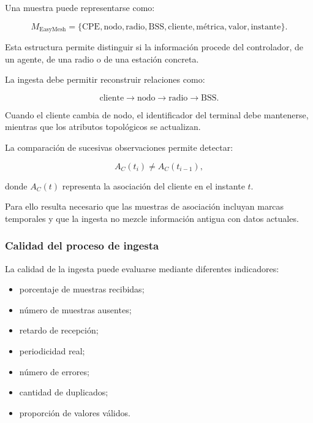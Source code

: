 Una muestra puede representarse como:

\[
    M_{\mathrm{EasyMesh}}
    =
    \{
        \text{CPE},
        \text{nodo},
        \text{radio},
        \text{BSS},
        \text{cliente},
        \text{métrica},
        \text{valor},
        \text{instante}
    \}.
\]

Esta estructura permite distinguir si la información procede del
controlador, de un agente, de una radio o de una estación concreta.

La ingesta debe permitir reconstruir relaciones como:

\[
    \text{cliente}
    \longrightarrow
    \text{nodo}
    \longrightarrow
    \text{radio}
    \longrightarrow
    \text{BSS}.
\]

Cuando el cliente cambia de nodo, el identificador del terminal debe
mantenerse, mientras que los atributos topológicos se actualizan.

La comparación de sucesivas observaciones permite detectar:

\[
    A_C(t_i)
    \neq
    A_C(t_{i-1}),
\]

donde \(A_C(t)\) representa la asociación del cliente en el instante
\(t\).

Para ello resulta necesario que las muestras de asociación incluyan
marcas temporales y que la ingesta no mezcle información antigua con
datos actuales.


\subsubsection*{Calidad del proceso de ingesta}

La calidad de la ingesta puede evaluarse mediante diferentes
indicadores:

\begin{itemize}
    \item porcentaje de muestras recibidas;

    \item número de muestras ausentes;

    \item retardo de recepción;

    \item periodicidad real;

    \item número de errores;

    \item cantidad de duplicados;

    \item proporción de valores válidos.
\end{itemize}

